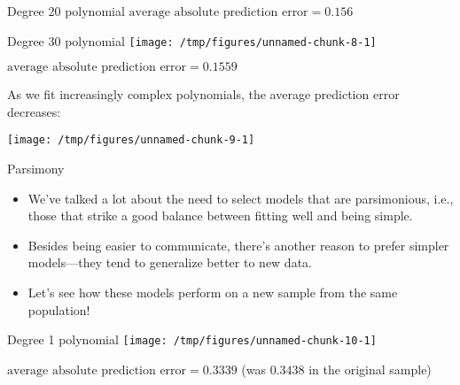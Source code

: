 \documentclass{beamer}\usepackage[]{graphicx}\usepackage[]{color}
\makeatletter
\def\maxwidth{ %
  \ifdim\Gin@nat@width>\linewidth
    \linewidth
  \else
    \Gin@nat@width
  \fi
}
\newenvironment{knitrout}{}{} %
\makeatother
\begin{document}
\begin{darkframes}
\begin{frame}{Degree 20 polynomial}
\begin{knitrout}
\end{knitrout}
      \vspace{-1cm} $\text{average absolute prediction error} = 0.156$
    \end{frame}

    \begin{frame}{Degree 30 polynomial}
\begin{knitrout}
\color{fgcolor}
\texttt{[image: /tmp/figures/unnamed-chunk-8-1]} 

\end{knitrout}
      \vspace{-1cm} $\text{average absolute prediction error} = 0.1559$
    \end{frame}

    \begin{frame}
      As we fit increasingly complex polynomials, the average prediction error decreases:

\begin{knitrout}
\color{fgcolor}
\texttt{[image: /tmp/figures/unnamed-chunk-9-1]} 

\end{knitrout}
    \end{frame}

    \begin{frame}{Parsimony}
      \begin{itemize}
        \item We've talked a lot about the need to select models that are \alert{parsimonious}, i.e., those that strike a good balance between fitting well and being simple.
        \item Besides being easier to communicate, there's another reason to prefer simpler models---they tend to generalize better to new data.
        \item Let's see how these models perform on a new sample from the same population!
      \end{itemize}
    \end{frame}

    \begin{frame}{Degree 1 polynomial}
\begin{knitrout}
\color{fgcolor}
\texttt{[image: /tmp/figures/unnamed-chunk-10-1]} 

\end{knitrout}
      \vspace{-1cm} $\text{average absolute prediction error} = 0.3339$
      (was $0.3438$ in the original sample)
    \end{frame}


\end{darkframes}
\end{document}
